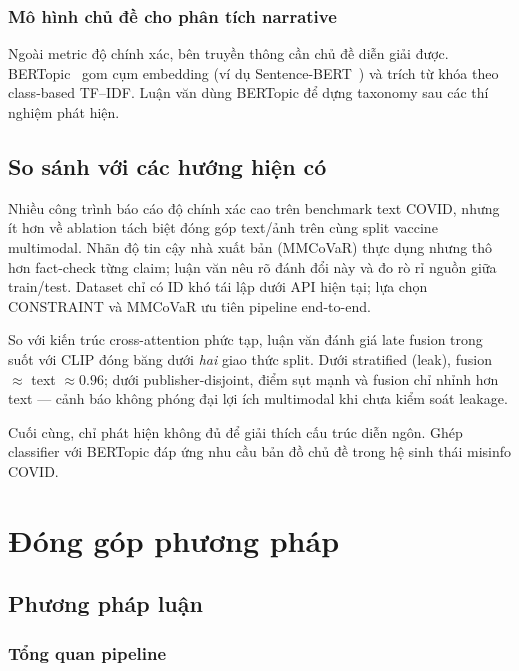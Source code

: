 \documentclass[12pt, a4paper]{report}
\begin{document}
\subsection{Mô hình chủ đề cho phân tích narrative}

Ngoài metric độ chính xác, bên truyền thông cần chủ đề diễn giải được.
BERTopic~\cite{grootendorst2022bertopic} gom cụm embedding (ví dụ Sentence-BERT~\cite{reimers2019sentence}) và trích từ khóa theo class-based TF--IDF.
Luận văn dùng BERTopic để dựng taxonomy sau các thí nghiệm phát hiện.

\section{So sánh với các hướng hiện có}
\label{sec:comparison}

Nhiều công trình báo cáo độ chính xác cao trên benchmark text COVID, nhưng ít hơn về ablation tách biệt đóng góp text/ảnh trên cùng split vaccine multimodal.
Nhãn độ tin cậy nhà xuất bản (MMCoVaR) thực dụng nhưng thô hơn fact-check từng claim; luận văn nêu rõ đánh đổi này và đo rò rỉ nguồn giữa train/test.
Dataset chỉ có ID khó tái lập dưới API hiện tại; lựa chọn CONSTRAINT và MMCoVaR ưu tiên pipeline end-to-end.

So với kiến trúc cross-attention phức tạp, luận văn đánh giá late fusion trong suốt với CLIP đóng băng dưới \emph{hai} giao thức split.
Dưới stratified (leak), fusion $\approx$ text $\approx 0.96$; dưới publisher-disjoint, điểm sụt mạnh và fusion chỉ nhỉnh hơn text --- cảnh báo không phóng đại lợi ích multimodal khi chưa kiểm soát leakage.

Cuối cùng, chỉ phát hiện không đủ để giải thích cấu trúc diễn ngôn.
Ghép classifier với BERTopic đáp ứng nhu cầu bản đồ chủ đề trong hệ sinh thái misinfo COVID.

\chapter{Đóng góp phương pháp}
\label{chap:contribution}

\section{Phương pháp luận}
\label{sec:methodology}

\subsection{Tổng quan pipeline}
\end{document}
